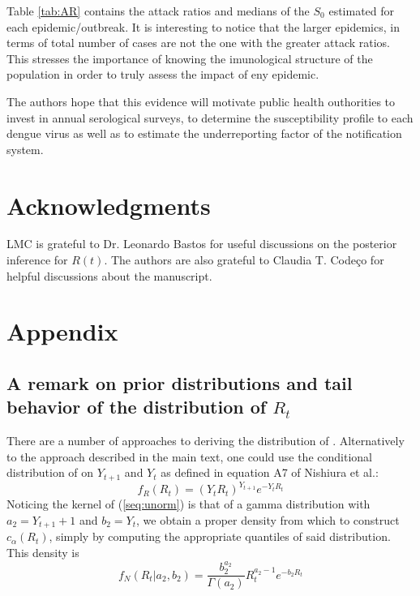 Table \ref{tab:AR} contains the attack ratios and medians of the $S_0$ 
estimated for each epidemic/outbreak. It is interesting to notice that the 
larger epidemics, in terms of total number of cases are not the one with the 
greater attack ratios. This stresses the importance of knowing the imunological 
structure of the population in order to truly assess the impact of eny 
epidemic. 

The authors hope that this evidence will motivate public health 
outhorities to invest in annual serological surveys, to determine the 
susceptibility profile to each dengue virus as well as to estimate the 
underreporting factor of the notification system.
\section*{Acknowledgments}
LMC is grateful to Dr. Leonardo Bastos for useful discussions on the 
posterior inference for $R(t)$.
The authors are also grateful to Claudia T. 
Code\c{c}o for helpful discussions about the manuscript.

\section*{Appendix}
\subsection*{A remark on prior distributions and tail behavior of the 
distribution of $R_t$}
\label{sec:tails}
There are a number of approaches to deriving the distribution of \rr.
Alternatively to the approach described in the main text\cite{mantel}, one 
could use the conditional distribution of \rr on 
$Y_{t+1}$ and $Y_t$ as defined in equation A7 of Nishiura et al.\cite{nishiura}:
\begin{equation}
\label{seq:unorm}
f_{R}(R_{t}) = (Y_tR_{t})^{Y_{t+1}} e^{-Y_tR_{t}}
\end{equation}
Noticing the kernel of (\ref{seq:unorm}) is that of a gamma distribution with 
$a_2 = Y_{t+1}+1$ and $b_2 = Y_t$, we obtain a proper density from which to 
construct $c_{\alpha}(R_t)$, simply by computing the appropriate quantiles of 
said distribution.
 This density is
\begin{equation}
\label{seq:densityNishiura}
f_N(R_t| a_2, b_2) =  \frac{b_2^{a_2}}{\Gamma(a_2)} R_t^{a_2-1} e^{-b_2 R_t}
\end{equation}

